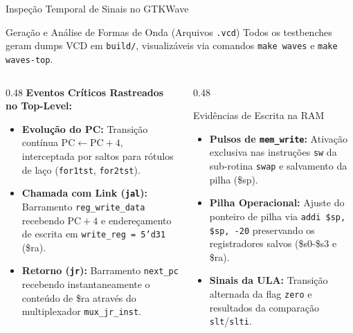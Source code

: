 \documentclass[aspectratio=169, 11pt]{beamer}
\begin{document}
\begin{frame}{Inspeção Temporal de Sinais no GTKWave}
  \begin{block}{Geração e Análise de Formas de Onda (Arquivos \texttt{.vcd})}
    Todos os testbenches geram dumps VCD em \texttt{build/}, visualizáveis via comandos \texttt{make waves} e \texttt{make waves-top}.
  \end{block}

  \vspace{0.3cm}
  \begin{columns}[T]
    \begin{column}{0.48\textwidth}
      \textbf{Eventos Críticos Rastreados no Top-Level:}
      \begin{itemize}\setlength{\itemsep}{5pt}
        \item \textbf{Evolução do PC:} Transição contínua $\text{PC} \leftarrow \text{PC}+4$, interceptada por saltos para rótulos de laço (\texttt{for1tst}, \texttt{for2tst}).
        \item \textbf{Chamada com Link (\texttt{jal}):} Barramento \texttt{reg\_write\_data} recebendo $\text{PC}+4$ e endereçamento de escrita em \texttt{write\_reg = 5'd31} (\$ra).
        \item \textbf{Retorno (\texttt{jr}):} Barramento \texttt{next\_pc} recebendo instantaneamente o conteúdo de \$ra através do multiplexador \texttt{mux\_jr\_inst}.
      \end{itemize}
    \end{column}

    \begin{column}{0.48\textwidth}
      \begin{exampleblock}{Evidências de Escrita na RAM}
        \begin{itemize}\setlength{\itemsep}{5pt}
          \item \textbf{Pulsos de \texttt{mem\_write}:} Ativação exclusiva nas instruções \texttt{sw} da sub-rotina \texttt{swap} e salvamento da pilha (\$sp).
          \item \textbf{Pilha Operacional:} Ajuste do ponteiro de pilha via \texttt{addi \$sp, \$sp, -20} preservando os registradores salvos (\$s0-\$s3 e \$ra).
          \item \textbf{Sinais da ULA:} Transição alternada da flag \texttt{zero} e resultados da comparação \texttt{slt}/\texttt{slti}.
        \end{itemize}
      \end{exampleblock}
    \end{column}
  \end{columns}
\end{frame}
\end{document}
